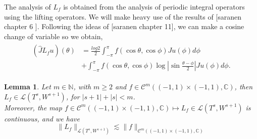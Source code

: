\documentclass{article}
\newtheorem{lemma}[theorem]{Lemma}
\newcommand{\todo}[1]{{\color{red}[#1]}}
\newcommand{\IC}{{\mathbb C}}
\newcommand{\IN}{{\mathbb N}}
\newcommand{\cmspace}[3]{\mathcal{C}^{#1} \left( #2, #3 \right)}
\newcommand{\iinterv}{(-1,1)\times(-1,1)}
\begin{document}
The analysis of $L_f$ is obtained from the analysis of periodic integral operators using the lifting operators. We will make heavy use of the results of \todo{saranen chapter 6  }. Following the ideas of \todo{saranen chapter 11}, we can make a cosine change of variable so we obtain,
\begin{align}
\label{eq:Lsplit}
\begin{split}
(\widehat{J}L_fu)(\theta) &= \frac{log{2}}{2} \int_{-\pi}^{\pi} f(\cos \theta , \cos \phi) Ju(\phi) d\phi \\&+ \int_{-\pi}^{\pi} f(\cos \theta, \cos \phi) \log \left\vert \sin \frac{\theta-\phi}{2} \right\vert Ju(\phi) d\phi.
\end{split}
\end{align}

\begin{lemma}
\label{lemma:Lfoperator}
Let $m \in \IN$, with $m\geq 2$ and $f \in \cmspace{m}{\iinterv}{\IC}$, then $L_f \in \mathcal{L}(T^s,W^{s+1})$, for $|s+1| +|s| <m$. \\Moreover, the map $f \in \cmspace{m}{\iinterv}{\IC} \mapsto L_f \in \mathcal{L}(T^s,W^{s+1})$ is continuous, and we have 
$$
\|L_f\|_{\mathcal{L}(T^s,W^{s+1})} \lesssim \|f\|_{\cmspace{m}{\iinterv}{\IC}}
$$
\end{lemma}
\end{document}
